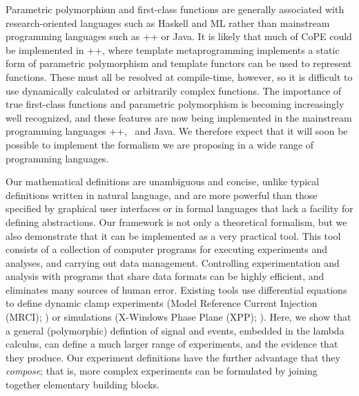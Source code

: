 Parametric polymorphism and first-class functions are generally
associated with research-oriented languages such as Haskell and ML
rather than mainstream programming languages such as \C++ or Java. It
is likely that much of CoPE could be implemented in \C++, where
template metaprogramming implements a static form of parametric
polymorphism and template functors can be used to represent
functions. These must all be resolved at compile-time, however, so it
is difficult to use dynamically calculated or arbitrarily complex
functions. The importance of true first-class functions and parametric
polymorphism is becoming increasingly well recognized, and these
features are now being implemented in the mainstream programming
languages \C++, \Csharp\, and Java. We therefore expect that it will
soon be possible to implement the formalism we are proposing in a wide
range of programming languages.

%
% 
%
Our mathematical definitions are unambiguous and concise, unlike
typical definitions written in natural language, and are more powerful
than those specified by graphical user interfaces or in formal
languages that lack a facility for defining abstractions. Our
framework is not only a theoretical formalism, but we also demonstrate
that it can be implemented as a very practical tool. This tool
consists of a collection of computer programs for executing
experiments and analyses, and carrying out data
management. Controlling experimentation and analysis with programs
that share data formats can be highly efficient, and eliminates many
sources of human error. Existing tools use differential equations to
define dynamic clamp experiments (Model Reference Current Injection
(MRCI); \citep{Raikov2004}) or simulations (X-Windows Phase Plane
(XPP); \citep{Ermentrout1987}). Here, we show that a general
(polymorphic) defintion of signal and events, embedded in the lambda
calculus, can define a much larger range of experiments, and the
evidence that they produce. Our experiment definitions have the
further advantage that they \emph{compose}; that is, more complex
experiments can be formulated by joining together elementary building
blocks.

